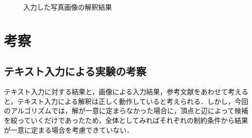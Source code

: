 \documentclass{jarticle}
\begin{document}
\begin{figure}[H]
{		\label{fig:pic1_non_res}}
	\caption{入力した写真画像の解釈結果}
	\label{fig:res_pic}
\end{figure}






\section{考察}
\subsection{テキスト入力による実験の考察}
テキスト入力に対する結果と，画像による入力結果，参考文献\cite{ref:labeling}をあわせて考えると，テキスト入力による解釈は正しく動作していると考えられる．しかし，今回のアルゴリズムでは，解が一意に定まらなかった場合に，頂点と辺によって候補を絞っていくだけであったため，全体としてみればそれぞれの制約条件から結果が一意に定まる場合を考慮できていない．
\end{document}
